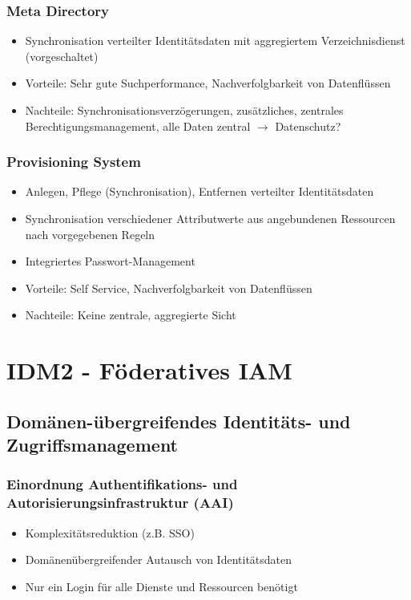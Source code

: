 \subsubsection{Meta Directory}
\begin{itemize}
	\item Synchronisation verteilter Identitätsdaten mit aggregiertem Verzeichnisdienst (vorgeschaltet)
	\item Vorteile: Sehr gute Suchperformance, Nachverfolgbarkeit von Datenflüssen
	\item Nachteile: Synchronisationsverzögerungen, zusätzliches, zentrales Berechtigungsmanagement, alle Daten zentral $\rightarrow$ Datenschutz?
\end{itemize}

\subsubsection{Provisioning System}
\begin{itemize}
	\item Anlegen, Pflege (Synchronisation), Entfernen verteilter Identitätsdaten
	\item Synchronisation verschiedener Attributwerte aus angebundenen Ressourcen nach vorgegebenen Regeln
	\item Integriertes Passwort-Management
	\item Vorteile: Self Service, Nachverfolgbarkeit von Datenflüssen
	\item Nachteile: Keine zentrale, aggregierte Sicht
\end{itemize}



\section{IDM2 - Föderatives IAM}

\subsection{Domänen-übergreifendes Identitäts- und Zugriffsmanagement}

\subsubsection{Einordnung Authentifikations- und Autorisierungsinfrastruktur (AAI)}
\begin{itemize}
	\item Komplexitätsreduktion (z.B. SSO)
	\item Domänenübergreifender Autausch von Identitätsdaten
	\item Nur ein Login für alle Dienste und Ressourcen benötigt
\end{itemize}

